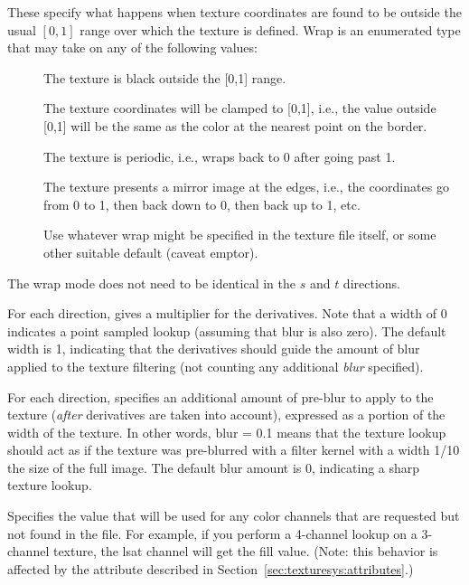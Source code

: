 These specify what happens when texture coordinates are found to be
outside the usual $[0,1]$ range over which the texture is defined.
{\cf Wrap} is an enumerated type that may take on any of the
following values:
\begin{description}
\item[\spc] \spc
\item[\rm {}] The texture is black outside the [0,1] range.
\item[\rm {}] The texture coordinates will be clamped to
  [0,1], i.e., the value outside [0,1] will be the same as the color
  at the nearest point on the border.
\item[\rm {}] The texture is periodic, i.e., wraps back
  to 0 after going past 1.
\item[\rm {}] The texture presents a mirror image at the
  edges, i.e., the coordinates go from 0 to 1, then back down to 0, then
  back up to 1, etc.
\item[\rm {}] Use whatever wrap might be specified in the
  texture file itself, or some other suitable default (caveat emptor).
\end{description}

The wrap mode does not need to be identical in the $s$ and $t$
directions.
\apiend

For each direction, gives a multiplier for the derivatives.  Note that
a width of 0 indicates a point sampled lookup (assuming that blur is
also zero).  The default width is 1, indicating that the derivatives
should guide the amount of blur applied to the texture filtering (not
counting any additional \emph{blur} specified).
\apiend

For each direction, specifies an additional amount of pre-blur to apply
to the texture (\emph{after} derivatives are taken into account),
expressed as a portion of the width of the texture.  In other words,
blur = 0.1 means that the texture lookup should act as if the texture
was pre-blurred with a filter kernel with a width 1/10 the size of the
full image.  The default blur amount is 0, indicating a sharp texture
lookup.
\apiend

Specifies the value that will be used for any color channels that are
requested but not found in the file.  For example, if you perform a
4-channel lookup on a 3-channel texture, the lsat channel will
get the fill value.  (Note: this behavior is affected by the
 attribute described in 
Section~\ref{sec:texturesys:attributes}.)
\apiend

